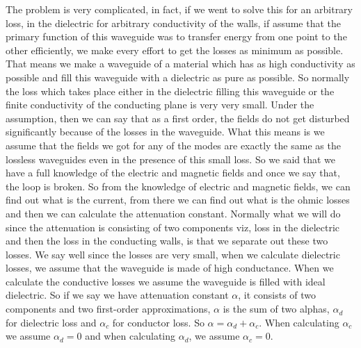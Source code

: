 The problem is very complicated, in fact, if we went to solve this for an arbitrary loss, in the dielectric for arbitrary conductivity of the walls, if assume that the primary function of this waveguide was to transfer energy from one point to the other efficiently, we make every effort to get the losses as minimum as possible. That means we make a waveguide of a material which has as high conductivity as possible and fill this waveguide with a dielectric as pure as possible. So normally the loss which takes place either in the dielectric filling this waveguide or the finite conductivity of the conducting plane is very very small. Under the assumption, then we can say that as a first order, the fields do not get disturbed significantly because of the losses in the waveguide. What this means is we assume that the fields we got for any of the modes are exactly the same as the lossless waveguides even in the presence of this small loss. So we said that we have a full knowledge of the electric and magnetic fields and once we say that, the loop is broken. So from the knowledge of electric and magnetic fields, we can find out what is the current, from there we can find out what is the ohmic losses and then we can calculate the attenuation constant. Normally what we will do since the attenuation is consisting of two components viz, loss in the dielectric and then the loss in the conducting walls, is that we separate out these two losses. We say well since the losses are very small, when we calculate dielectric losses, we assume that the waveguide is made of high conductance. When we calculate the conductive losses we assume the waveguide is filled with ideal dielectric. So if we say we have attenuation constant $\alpha$, it consists of two components and two first-order approximations, $\alpha$ is the sum of two alphas, $\alpha_{d}$ for dielectric loss and  $\alpha_{c}$ for conductor loss. So $\alpha =  \alpha_{d} +  \alpha_{c}$. When calculating $\alpha_{c}$ we assume  $\alpha_{d} = 0$ and when calculating  $\alpha_{d}$, we assume  $\alpha_{c} = 0$.
	
